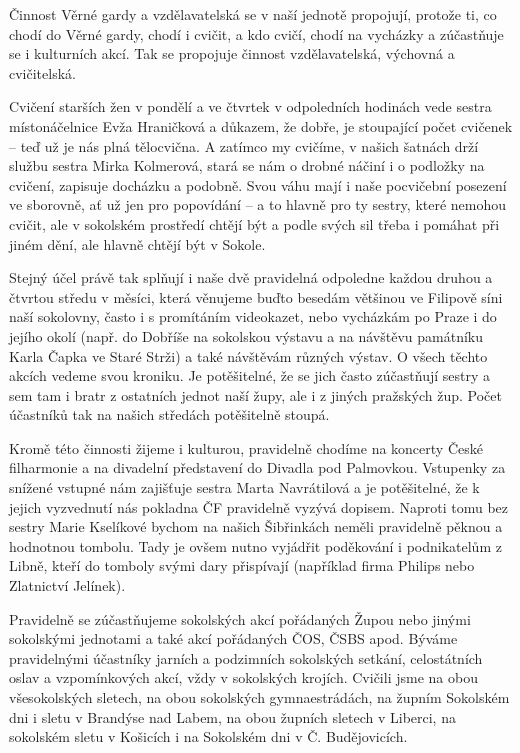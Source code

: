 Činnost Věrné gardy a vzdělavatelská se v naší jednotě propojují,
protože ti, co chodí do Věrné gardy, chodí i cvičit, a kdo cvičí, chodí
na vycházky a zúčastňuje se i kulturních akcí. Tak se propojuje činnost
vzdělavatelská, výchovná a cvičitelská.

Cvičení starších žen v pondělí a ve čtvrtek v odpoledních hodinách vede
sestra místonáčelnice Evža Hraničková a důkazem, že dobře, je stoupající
počet cvičenek -- teď už je nás plná tělocvična. A zatímco my cvičíme, v
našich šatnách drží službu sestra Mirka Kolmerová, stará se nám o drobné
náčiní i o podložky na cvičení, zapisuje docházku a podobně. Svou váhu
mají i naše pocvičební posezení ve sborovně, ať už jen pro popovídání --
a to hlavně pro ty sestry, které nemohou cvičit, ale v sokolském
prostředí chtějí být a podle svých sil třeba i pomáhat při jiném dění,
ale hlavně chtějí být v Sokole.

Stejný účel právě tak splňují i naše dvě pravidelná odpoledne každou
druhou a čtvrtou středu v měsíci, která věnujeme buďto besedám většinou
ve Filipově síni naší sokolovny, často i s promítáním videokazet, nebo
vycházkám po Praze i do jejího okolí (např. do Dobříše na sokolskou
výstavu a na návštěvu památníku Karla Čapka ve Staré Strži) a také
návštěvám různých výstav. O všech těchto akcích vedeme svou kroniku. Je
potěšitelné, že se jich často zúčastňují sestry a sem tam i bratr z
ostatních jednot naší župy, ale i z jiných pražských žup. Počet
účastníků tak na našich středách potěšitelně stoupá.

Kromě této činnosti žijeme i kulturou, pravidelně chodíme na koncerty
České filharmonie a na divadelní představení do Divadla pod Palmovkou.
Vstupenky za snížené vstupné nám zajišťuje sestra Marta Navrátilová a je
potěšitelné, že k jejich vyzvednutí nás pokladna ČF pravidelně vyzývá
dopisem. Naproti tomu bez sestry Marie Kselíkové bychom na našich
Šibřinkách neměli pravidelně pěknou a hodnotnou tombolu. Tady je ovšem
nutno vyjádřit poděkování i podnikatelům z Libně, kteří do tomboly svými
dary přispívají (například firma Philips nebo Zlatnictví Jelínek).

Pravidelně se zúčastňujeme sokolských akcí pořádaných Župou nebo jinými
sokolskými jednotami a také akcí pořádaných ČOS, ČSBS apod. Býváme
pravidelnými účastníky jarních a podzimních sokolských setkání,
celostátních oslav a vzpomínkových akcí, vždy v sokolských krojích.
Cvičili jsme na obou všesokolských sletech, na obou sokolských
gymnaestrádách, na župním Sokolském dni i sletu v Brandýse nad Labem, na
obou župních sletech v Liberci, na sokolském sletu v Košicích i na
Sokolském dni v Č. Budějovicích.

